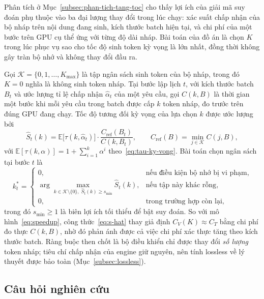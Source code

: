 Phân tích ở Mục~\ref{subsec:phan-tich-tang-toc} cho thấy lợi ích của giải mã suy đoán phụ thuộc vào ba đại lượng thay đổi trong lúc chạy: xác suất chấp nhận của bộ nháp trên nội dung đang sinh, kích thước batch hiện tại, và chi phí của một bước trên GPU cụ thể ứng với từng độ dài nháp. Bài toán của đồ án là chọn $K$ trong lúc phục vụ sao cho tốc độ sinh token kỳ vọng là lớn nhất, đồng thời không gây tràn bộ nhớ và không thay đổi đầu ra.

Gọi $\mathcal{K} = \{0, 1, \dots, K_{\max}\}$ là tập ngân sách sinh token của bộ nháp, trong đó $K=0$ nghĩa là không sinh token nháp. Tại bước lập lịch $t$, với kích thước batch $B_t$ và ước lượng tỉ lệ chấp nhận $\hat{\alpha}_t$ của một yêu cầu, gọi $C(k, B)$ là thời gian một bước khi mỗi yêu cầu trong batch được cấp $k$ token nháp, đo trước trên đúng GPU đang chạy. Tốc độ tương đối kỳ vọng của lựa chọn $k$ được ước lượng bởi
\begin{equation}\label{eq:s-hat}
  \hat{S}_t(k) = \mathbb{E}\bigl[\tau(k, \hat{\alpha}_t)\bigr] \cdot \frac{C_{\text{ref}}(B_t)}{C(k, B_t)},
  \qquad C_{\text{ref}}(B) = \min_{j \in \mathcal{K}} C(j, B),
\end{equation}
với $\mathbb{E}[\tau(k,\alpha)] = 1 + \sum_{i=1}^{k} \alpha^{i}$ theo~\eqref{eq:tau-ky-vong}. Bài toán chọn ngân sách tại bước $t$ là
\begin{equation}\label{eq:bai-toan}
  k_t^\ast =
  \begin{cases}
    0, & \text{nếu điều kiện bộ nhớ bị vi phạm},\\[2pt]
    \arg\max\limits_{k \in \mathcal{K}\setminus\{0\},\; \hat{S}_t(k) \ge s_{\min}} \hat{S}_t(k), & \text{nếu tập này khác rỗng},\\[2pt]
    0, & \text{trong trường hợp còn lại},
  \end{cases}
\end{equation}
trong đó $s_{\min} \ge 1$ là biên lợi ích tối thiểu để bật suy đoán. So với mô hình~\eqref{eq:speedup}, công thức~\eqref{eq:s-hat} thay giả định $C_V(K) \approx C_T$ bằng chi phí đo thực $C(k, B)$, nhờ đó phản ánh được cả việc chi phí xác thực tăng theo kích thước batch. Ràng buộc then chốt là bộ điều khiển chỉ được thay đổi \emph{số lượng} token nháp; tiêu chí chấp nhận của engine giữ nguyên, nên tính lossless về lý thuyết được bảo toàn (Mục~\ref{subsec:lossless}).

\subsection{Câu hỏi nghiên cứu}

